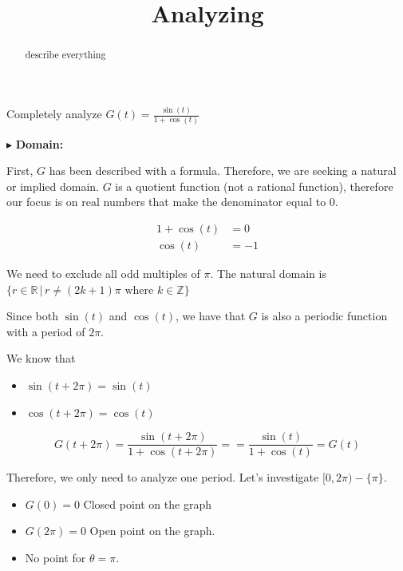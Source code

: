 \documentclass{ximera}
\title{Analyzing}
\begin{document}
\begin{abstract}
describe everything
\end{abstract}
\maketitle







Completely analyze $G(t) = \frac{\sin(t)}{1 + \cos(t)}$

$\blacktriangleright$  \textbf{\textcolor{blue!55!black}{Domain: }} 

First, $G$ has been described with a formula.  Therefore, we are seeking a natural or implied domain. $G$ is a quotient function (not a rational function), therefore our focus is on real numbers that make the denominator equal to $0$.



\begin{align*}
1  + \cos(t) & = 0 \\
\cos(t) & = -1
\end{align*}


We need to exclude all odd multiples of $\pi$.  The natural domain is $\{  r \in \mathbb{R} \, | \, r \ne (2k+1)\pi \text{ where } k \in \mathbb{Z}   \}$



\begin{observation}  

Since both $\sin(t)$ and $\cos(t)$, we have that $G$ is also a periodic function with a period of $2\pi$. 

We know that
\begin{itemize}
  \item $\sin(t + 2\pi) = \sin(t)$
  \item $\cos(t + 2\pi) = \cos(t)$
\end{itemize}

\[    G(t + 2\pi) = \frac{\sin(t+2\pi)}{1 + \cos(t+2\pi)} == \frac{\sin(t)}{1 + \cos(t)} = G(t)   \]



\end{observation}


Therefore, we only need to analyze one period.  Let's investigate $[0, 2\pi) - \{ \pi \}$.

\begin{itemize}
\item $G(0) = 0$   Closed point on the graph
\item $G(2\pi) = 0$  Open point on the graph.
\item No point for $\theta = \pi$.
\end{itemize}
\end{document}
